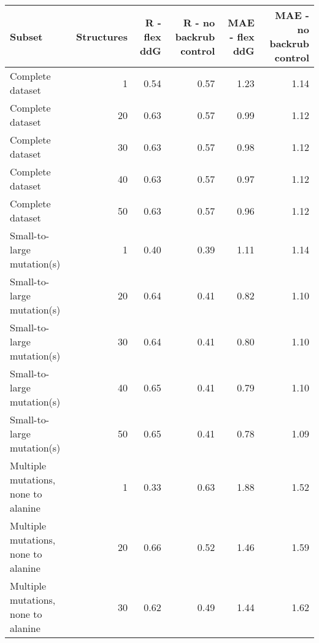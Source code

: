 \begin{table}
\begin{tabular}{lrrrrr}
\toprule
                              Subset &  Structures &  R - flex ddG &  R - no backrub control &  MAE - flex ddG &  MAE - no backrub control \\
\midrule
                    Complete dataset &           1 &          0.54 &                    0.57 &            1.23 &                      1.14 \\
                    Complete dataset &          20 &          0.63 &                    0.57 &            0.99 &                      1.12 \\
                    Complete dataset &          30 &          0.63 &                    0.57 &            0.98 &                      1.12 \\
                    Complete dataset &          40 &          0.63 &                    0.57 &            0.97 &                      1.12 \\
                    Complete dataset &          50 &          0.63 &                    0.57 &            0.96 &                      1.12 \\
          Small-to-large mutation(s) &           1 &          0.40 &                    0.39 &            1.11 &                      1.14 \\
          Small-to-large mutation(s) &          20 &          0.64 &                    0.41 &            0.82 &                      1.10 \\
          Small-to-large mutation(s) &          30 &          0.64 &                    0.41 &            0.80 &                      1.10 \\
          Small-to-large mutation(s) &          40 &          0.65 &                    0.41 &            0.79 &                      1.10 \\
          Small-to-large mutation(s) &          50 &          0.65 &                    0.41 &            0.78 &                      1.09 \\
 Multiple mutations, none to alanine &           1 &          0.33 &                    0.63 &            1.88 &                      1.52 \\
 Multiple mutations, none to alanine &          20 &          0.66 &                    0.52 &            1.46 &                      1.59 \\
 Multiple mutations, none to alanine &          30 &          0.62 &                    0.49 &            1.44 &                      1.62 \\

\end{tabular}
\end{table}
